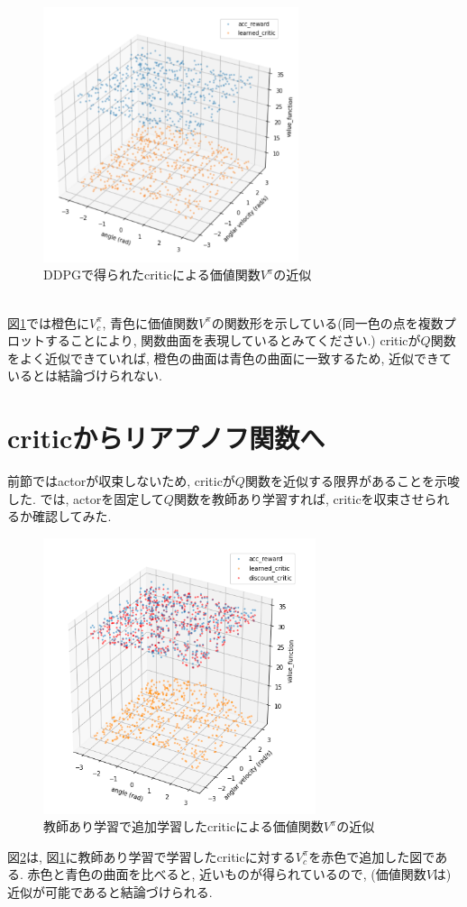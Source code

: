 \documentclass{jsarticle}
\begin{document}
\begin{figure}[h]
	\centering
 	\includegraphics[width=7.5cm]{critic_approximation.png}
 	\caption{DDPGで得られたcriticによる価値関数$V^{\pi}$の近似} \label{critic_approximation}
\end{figure}\\
図\ref{critic_approximation}では橙色に$V^{\pi}_{c}$, 青色に価値関数$V^{\pi}$の関数形を示している(同一色の点を複数プロットすることにより, 関数曲面を表現しているとみてください.) criticが$Q$関数をよく近似できていれば, 橙色の曲面は青色の曲面に一致するため, 近似できているとは結論づけられない.

\section{criticからリアプノフ関数へ}
前節ではactorが収束しないため, criticが$Q$関数を近似する限界があることを示唆した. では, actorを固定して$Q$関数を教師あり学習すれば, criticを収束させられるか確認してみた.

\begin{figure}[h]
	\centering
 	\includegraphics[width=8cm]{supervised_critic.png}
 	\caption{教師あり学習で追加学習したcriticによる価値関数$V^{\pi}$の近似} \label{supervised_critic}
\end{figure}\par
図\ref{supervised_critic}は, 図\ref{critic_approximation}に教師あり学習で学習したcriticに対する$V^{\pi}_{c}$を赤色で追加した図である. 赤色と青色の曲面を比べると, 近いものが得られているので, (価値関数$V$は)近似が可能であると結論づけられる.
\end{document}
